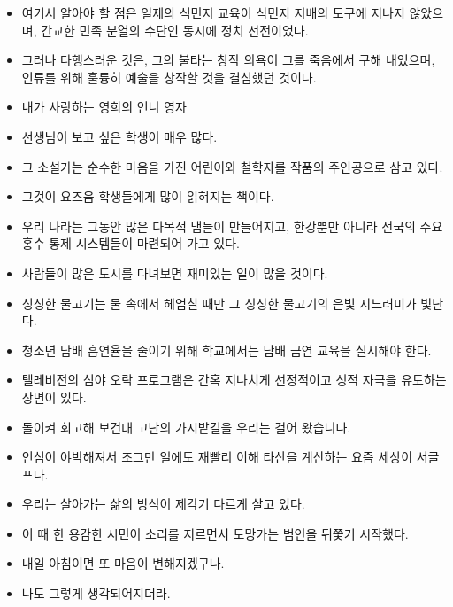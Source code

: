 \documentclass[10pt]{report}
\begin{document}
\begin{itemize}
\item
여기서 알아야 할 점은 일제의 식민지 교육이 식민지 지배의 도구에 지나지 않았으며, 간교한 민족 분열의 수단인 동시에 정치 선전이었다. 

\item
그러나 다행스러운 것은, 그의 불타는 창작 의욕이 그를 죽음에서 구해 내었으며, 인류를 위해 훌륭히 예술을 창작할 것을 결심했던 것이다. 

\item
내가 사랑하는 영희의 언니 영자

\item
선생님이 보고 싶은 학생이 매우 많다. 

\item
그 소설가는 순수한 마음을 가진 어린이와 철학자를 작품의 주인공으로 삼고 있다. 
\item
그것이 요즈음 학생들에게 많이 읽혀지는 책이다.

\item
우리 나라는 그동안 많은 다목적 댐들이 만들어지고, 한강뿐만 아니라 전국의 주요 홍수 통제 시스템들이 마련되어 가고 있다. 
\item
사람들이 많은 도시를 다녀보면 재미있는 일이 많을 것이다.

\item
싱싱한 물고기는 물 속에서 헤엄칠 때만 그 싱싱한 물고기의 은빛 지느러미가 빛난다. 

\item
청소년 담배 흡연율을 줄이기 위해 학교에서는 담배 금연 교육을 실시해야 한다. 

\item
텔레비전의 심야 오락 프로그램은 간혹 지나치게 선정적이고 성적 자극을 유도하는 장면이 있다. 

\item
돌이켜 회고해 보건대 고난의 가시밭길을 우리는 걸어 왔습니다. 

\item
인심이 야박해져서 조그만 일에도 재빨리 이해 타산을 계산하는 요즘 세상이 서글프다.

\item
우리는 살아가는 삶의 방식이 제각기 다르게 살고 있다.

\item
이 때 한 용감한 시민이 소리를 지르면서 도망가는 범인을 뒤쫓기 시작했다. 

\item
내일 아침이면 또 마음이 변해지겠구나.

\item
나도 그렇게 생각되어지더라. 


\end{itemize}
\end{document}
